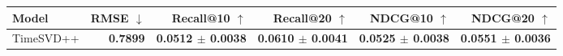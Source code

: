 \begin{tabular}{lrrrrr}
\toprule
Model & RMSE $\downarrow$ & Recall@10 $\uparrow$ & Recall@20 $\uparrow$ & NDCG@10 $\uparrow$ & NDCG@20 $\uparrow$ \\
\midrule
TimeSVD++ & \textbf{0.7899} & \textbf{0.0512 $\pm$ 0.0038} & \textbf{0.0610 $\pm$ 0.0041} & \textbf{0.0525 $\pm$ 0.0038} & \textbf{0.0551 $\pm$ 0.0036} \\
\bottomrule
\end{tabular}
